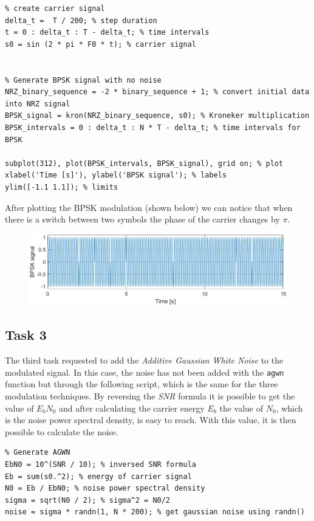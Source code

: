 \begin{lstlisting}
% create carrier signal
delta_t =  T / 200; % step duration
t = 0 : delta_t : T - delta_t; % time intervals
s0 = sin (2 * pi * F0 * t); % carrier signal


% Generate BPSK signal with no noise
NRZ_binary_sequence = -2 * binary_sequence + 1; % convert initial data into NRZ signal
BPSK_signal = kron(NRZ_binary_sequence, s0); % Kroneker multiplication
BPSK_intervals = 0 : delta_t : N * T - delta_t; % time intervals for BPSK 

subplot(312), plot(BPSK_intervals, BPSK_signal), grid on; % plot
xlabel('Time [s]'), ylabel('BPSK signal'); % labels
ylim([-1.1 1.1]); % limits
\end{lstlisting}

\noindent After plotting the BPSK modulation (shown below) we can notice that when there is a switch between two symbols the phase of the carrier changes by $\pi$.

\begin{figure}[!h]
    \centering
    \includegraphics[width = .7\textwidth]{lab-3/imgs/task2_BPSK.png}
\end{figure}
\vspace*{-15px}

\subsection*{Task 3}
The third task requested to add the \textsl{Additive Gaussian White Noise} to the modulated signal. In this case, the noise has not been added with the \texttt{agwn} function but through the following script, which is the same for the three modulation techniques. By reversing the \textsl{SNR} formula it is possible to get the value of $E_bN_0$ and after calculating the carrier energy $E_b$ the value of $N_0$, which is the noise power spectral density, is easy to reach. With this value, it is then possible to calculate the noise.

\begin{lstlisting}
% Generate AGWN
EbN0 = 10^(SNR / 10); % inversed SNR formula
Eb = sum(s0.^2); % energy of carrier signal
N0 = Eb / EbN0; % noise power spectral density
sigma = sqrt(N0 / 2); % sigma^2 = N0/2
noise = sigma * randn(1, N * 200); % get gaussian noise using randn()
\end{lstlisting}

